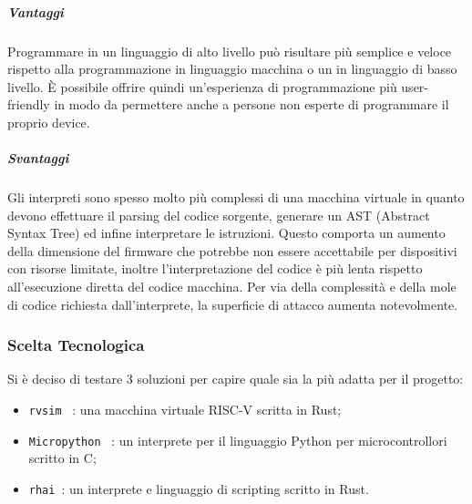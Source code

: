 \subparagraph{Vantaggi}

Programmare in un linguaggio di alto livello può risultare più semplice e veloce rispetto alla programmazione in linguaggio macchina o un in linguaggio di basso livello.
È possibile offrire quindi un'esperienza di programmazione più user-friendly in modo da permettere anche a persone non esperte di programmare il proprio device.

\subparagraph{Svantaggi}

Gli interpreti sono spesso molto più complessi di una macchina virtuale in quanto devono effettuare il parsing del codice sorgente,
generare un AST (Abstract Syntax Tree) ed infine interpretare le istruzioni.
Questo comporta un aumento della dimensione del firmware che potrebbe non essere accettabile per dispositivi con
risorse limitate, inoltre l'interpretazione del codice è più lenta rispetto all'esecuzione diretta del codice macchina.
Per via della complessità e della mole di codice richiesta dall'interprete, la superficie di attacco aumenta notevolmente.

\subsubsection{Scelta Tecnologica}

Si è deciso di testare 3 soluzioni per capire quale sia la più adatta per il progetto:
\begin{itemize}
    \item \texttt{rvsim}~\cite{rvsim} : una macchina virtuale RISC-V scritta in Rust;
    \item \texttt{Micropython}~\cite{micropython} : un interprete per il linguaggio Python per microcontrollori scritto in C;
    \item \texttt{rhai}~\cite{rhai_website}: un interprete e linguaggio di scripting scritto in Rust.
\end{itemize}

